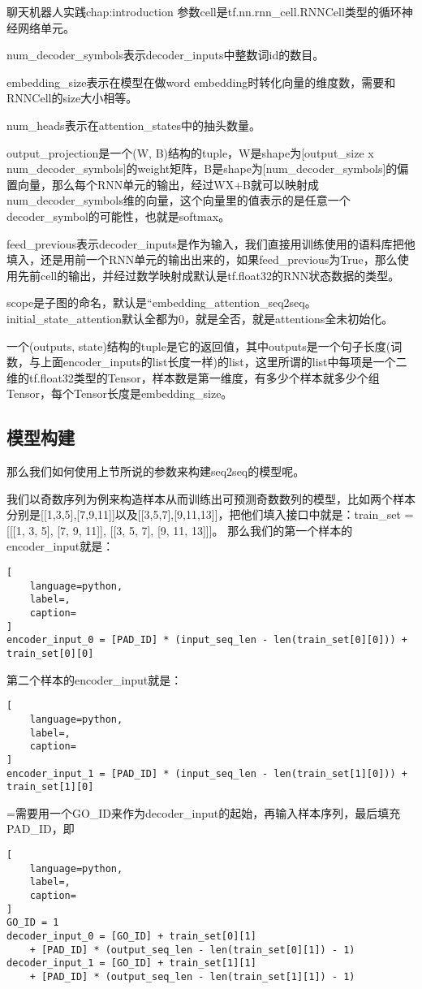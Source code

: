 \begin{cuzchapter}{聊天机器人实践}{chap:introduction}
参数cell是tf.nn.rnn\_cell.RNNCell类型的循环神经网络单元。

num\_decoder\_symbols表示decoder\_inputs中整数词id的数目。

embedding\_size表示在模型在做word embedding时转化向量的维度数，需要和RNNCell的size大小相等。

num\_heads表示在attention\_states中的抽头数量。

output\_projection是一个(W, B)结构的tuple，W是shape为[output\_size x num\_decoder\_symbols]的weight矩阵，B是shape为[num\_decoder\_symbols]的偏置向量，那么每个RNN单元的输出，经过WX+B就可以映射成num\_decoder\_symbols维的向量，这个向量里的值表示的是任意一个decoder\_symbol的可能性，也就是softmax。

feed\_previous表示decoder\_inputs是作为输入，我们直接用训练使用的语料库把他填入，还是用前一个RNN单元的输出出来的，如果feed\_previous为True，那么使用先前cell的输出，并经过数学映射成默认是tf.float32的RNN状态数据的类型。

scope是子图的命名，默认是“embedding\_attention\_seq2seq。initial\_state\_attention默认全都为0，就是全否，就是attentions全未初始化。

一个(outputs, state)结构的tuple是它的返回值，其中outputs是一个句子长度(词数，与上面encoder\_inputs的list长度一样)的list，这里所谓的list中每项是一个二维的tf.float32类型的Tensor，样本数是第一维度，有多少个样本就多少个组Tensor，每个Tensor长度是embedding\_size。
\subsection{模型构建}\label{sec:background}
那么我们如何使用上节所说的参数来构建seq2seq的模型呢。

我们以奇数序列为例来构造样本从而训练出可预测奇数数列的模型，比如两个样本分别是[[1,3,5],[7,9,11]]以及[[3,5,7],[9,11,13]]，把他们填入接口中就是：train\_set = [[[1, 3, 5], [7, 9, 11]], [[3, 5, 7], [9, 11, 13]]]。
那么我们的第一个样本的encoder\_input就是：
\begin{lstlisting}[
    language=python,
    label=,
    caption=
]
encoder_input_0 = [PAD_ID] * (input_seq_len - len(train_set[0][0])) + train_set[0][0]
\end{lstlisting}

第二个样本的encoder\_input就是：
\begin{lstlisting}[
    language=python,
    label=,
    caption=
]
encoder_input_1 = [PAD_ID] * (input_seq_len - len(train_set[1][0])) + train_set[1][0]
\end{lstlisting}
=需要用一个GO\_ID来作为decoder\_input的起始，再输入样本序列，最后填充PAD\_ID，即
\begin{lstlisting}[
    language=python,
    label=,
    caption=
]
GO_ID = 1
decoder_input_0 = [GO_ID] + train_set[0][1] 
    + [PAD_ID] * (output_seq_len - len(train_set[0][1]) - 1)
decoder_input_1 = [GO_ID] + train_set[1][1] 
    + [PAD_ID] * (output_seq_len - len(train_set[1][1]) - 1)
\end{lstlisting}


\end{cuzchapter}
